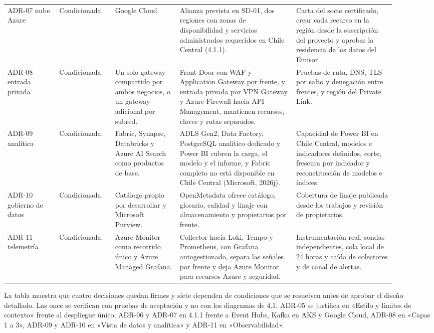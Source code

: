 \documentclass[11pt]{article}
\begin{document}
\begin{longtable}{@{}p{0.125\linewidth}p{0.12\linewidth}p{0.15\linewidth}p{0.27\linewidth}p{0.23\linewidth}@{}}
ADR-07 nube Azure & Condicionada. & Google Cloud. & Alianza prevista en SD-01, dos regiones con zonas de disponibilidad y servicios administrados requeridos en Chile Central (4.1.1). & Carta del socio certificado, crear cada recurso en la región desde la suscripción del proyecto y aprobar la residencia de los datos del Emisor. \\
ADR-08 entrada privada & Condicionada. & Un solo gateway compartido por ambos negocios, o un gateway adicional por subred. & Front Door con WAF y Application Gateway por frente, y entrada privada por VPN Gateway y Azure Firewall hacia API Management, mantienen recursos, claves y rutas separados. & Pruebas de ruta, DNS, TLS por salto y denegación entre frentes, y región del Private Link. \\
ADR-09 analítica & Condicionada. & Fabric, Synapse, Databricks y Azure AI Search como productos de base. & ADLS Gen2, Data Factory, PostgreSQL analítico dedicado y Power BI cubren la carga, el modelo y el informe, y Fabric completo no está disponible en Chile Central (Microsoft, 2026j). & Capacidad de Power BI en Chile Central, modelos e indicadores definidos, corte, frescura por indicador y reconstrucción de modelos e índices. \\
ADR-10 gobierno de datos & Condicionada. & Catálogo propio por desarrollar y Microsoft Purview. & OpenMetadata ofrece catálogo, glosario, calidad y linaje con almacenamiento y propietarios por frente. & Cobertura de linaje publicada desde los trabajos y revisión de propietarios. \\
ADR-11 telemetría & Condicionada. & Azure Monitor como recorrido único y Azure Managed Grafana. & Collector hacia Loki, Tempo y Prometheus, con Grafana autogestionado, separa las señales por frente y deja Azure Monitor para recursos Azure y seguridad. & Instrumentación real, sondas independientes, cola local de 24 horas y caída de colectores y de canal de alertas. \\
\end{longtable}

La tabla muestra que cuatro decisiones quedan firmes y siete dependen de condiciones que se resuelven antes de aprobar el diseño detallado. Las once se verifican con pruebas de aceptación y no con los diagramas de 4.1. ADR-05 se justifica en «Estilo y límites de contexto» frente al despliegue único, ADR-06 y ADR-07 en 4.1.1 frente a Event Hubs, Kafka en AKS y Google Cloud, ADR-08 en «Capas 1 a 3», ADR-09 y ADR-10 en «Vista de datos y analítica» y ADR-11 en «Observabilidad».
\end{document}
